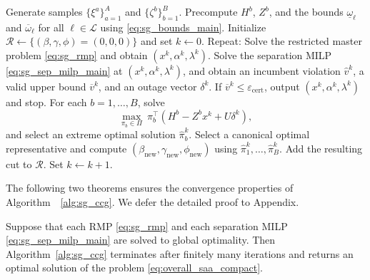 \begin{algorithm}[H]
\captionsetup{font=footnotesize}
\caption{Cut generation procedure for \eqref{eq:overall_saa_compact}}
\label{alg:sg_ccg}
\begin{algorithmic}[1]
\STATE Generate samples $\{\xi^a\}_{a=1}^A$ and $\{\zeta^b\}_{b=1}^B$.
\STATE Precompute $H^b$, $Z^b$, and the bounds
$\underline{\omega}_{\ell}$ and $\overline{\omega}_{\ell}$ for all
$\ell \in \mathcal{L}$ using \eqref{eq:sg_bounds_main}.
\STATE Initialize $\mathcal{R} \leftarrow \{(\beta,\gamma,\phi)=(0,0,0)\}$
and set $k \leftarrow 0$.
\STATE Repeat:
\STATE \hspace{1em} Solve the restricted master problem \eqref{eq:sg_rmp}
and obtain $(x^k,\alpha^k,\lambda^k)$.
\STATE \hspace{1em} Solve the separation MILP \eqref{eq:sg_sep_milp_main}
at $(x^k,\alpha^k,\lambda^k)$, and obtain an incumbent violation
$\widehat{v}^k$, a valid upper bound $\overline v^k$, and an outage vector
$\delta^k$.
\STATE \hspace{1em} If $\overline v^k \le \varepsilon_{\mathrm{cert}}$,
output $(x^k,\alpha^k,\lambda^k)$ and stop.
\STATE \hspace{1em} For each $b=1,\ldots,B$, solve
\[
\max_{\pi_b \in \Pi}\ \pi_b^\top(H^b - Z^b x^k + U\delta^k),
\]
and select an extreme optimal solution $\widehat{\pi}_b^k$.
\STATE \hspace{1em} Select a canonical optimal representative and compute
$(\beta_{\mathrm{new}},\gamma_{\mathrm{new}},\phi_{\mathrm{new}})$
using $\widehat{\pi}_1^k,\ldots,\widehat{\pi}_B^k$.
\STATE \hspace{1em} Add the resulting cut to $\mathcal{R}$.
\STATE \hspace{1em} Set $k \leftarrow k+1$.
\end{algorithmic}
\end{algorithm}

The following two theorems ensures the convergence properties of Algorithm~~\ref{alg:sg_ccg}. 
We defer the detailed proof to Appendix.
\begin{theorem}
\label{thm:sg_finite}
Suppose that each RMP \eqref{eq:sg_rmp} and each separation MILP \eqref{eq:sg_sep_milp_main} are solved to global optimality. Then Algorithm~\ref{alg:sg_ccg} terminates after finitely many iterations and returns an optimal solution of the problem \eqref{eq:overall_saa_compact}.
\end{theorem}

